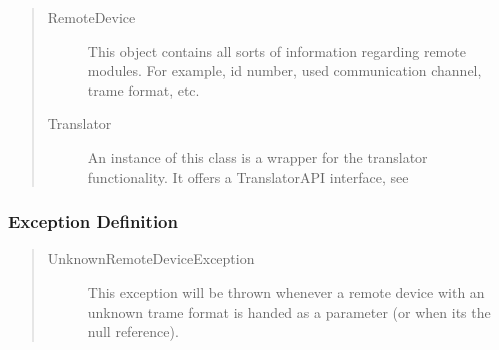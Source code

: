 \begin{quote}
	\begin{description}
		\item[RemoteDevice] This object contains all sorts of information regarding
		remote modules. For example, id number, used communication channel, trame
		format, etc.
		\item[Translator] An instance of this class is a wrapper for the translator
		functionality. It offers a TranslatorAPI interface, see %
	\end{description} 
\end{quote}

\subsubsection{Exception Definition} 

\begin{quote}
	\begin{description}
		\item[UnknownRemoteDeviceException] This exception will be thrown whenever a
		remote device with an unknown trame format is handed as a parameter (or when
		its the null reference).
	\end{description} 
\end{quote}